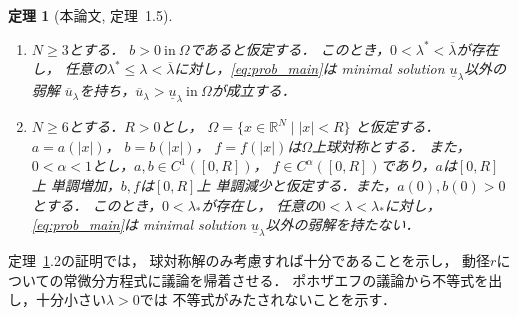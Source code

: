 \documentclass{jsarticle}
\newcommand{\sage}{
\addtolength{\itemindent}{1zw}
\addtolength{\parindent}{1zw}}
\theoremstyle{plain}
\newtheorem{thm}{定理}
\renewcommand{\bar}[1]{\overline{#1}}
\newcommand{\R}{\mathbb{R}}
\newcommand{\tin}{\text{in}~}
\begin{document}
\begin{thm}[本論文, 定理~1.5] \label{thm:second_solution_nonex}
 \begin{enumerate}[1.]  \sage
  \item $N \geq 3$とする．
        $b > 0 ~\tin \Omega$であると仮定する．
        このとき，$0 < \lambda^* < \bar{\lambda}$が存在し，
        任意の$\lambda^* \leq
        \lambda < \bar{\lambda}$に対し，\ref{eq:prob_main}は
        minimal solution $\underline{u}_\lambda$以外の弱解
        $\bar{u}_\lambda$を持ち，$\bar{u}_\lambda >
        \underline{u}_\lambda ~\tin \Omega$が成立する．
  \item $N \geq 6$とする．$R > 0$とし，
        $\Omega = \{ x \in \R^N \mid \lvert x \rvert < R\}$
        と仮定する．
        $a = a(\lvert x \rvert)$，
        $b = b(\lvert x \rvert)$，
        $f = f(\lvert x \rvert)$は$\Omega$上球対称とする．
        また，$0 < \alpha < 1$とし，$a , b \in C^1([0, R])$，
        $f \in C^\alpha([0, R])$であり，$a$は$[0, R]$上
        単調増加，$b, f$は$[0, R]$上
        単調減少と仮定する．また，$a(0), b(0) > 0$とする．
        このとき，$0 < \lambda_*$が存在し，
        任意の$0 < \lambda < \lambda_*$に対し，
        \ref{eq:prob_main}は
        minimal solution $\underline{u}_\lambda$以外の弱解を持たない．
 \end{enumerate}
\end{thm}

定理~\ref{thm:second_solution_nonex}.2の証明では，
球対称解のみ考慮すれば十分であることを示し，
動径$r$についての常微分方程式に議論を帰着させる．
ポホザエフの議論から不等式を出し，十分小さい$\lambda > 0$では
不等式がみたされないことを示す．



\end{document}
